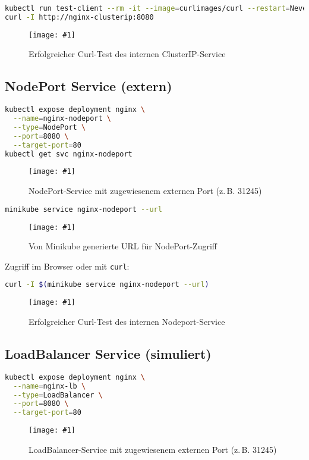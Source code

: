 \documentclass[BMR,Seminar,ngerman,IEEE]{twbook}
\newcommand{\screenshotH}[3]{%
  \begin{figure}[H]
    \centering
    \texttt{[image: \#1]}%
    \caption{#2}%
    \label{fig:#3}%
  \end{figure}%
}
\begin{document}
\begin{lstlisting}[language=bash,caption={Test im Cluster über temporären Curl-Pod}]
kubectl run test-client --rm -it --image=curlimages/curl --restart=Never -- sh
curl -I http://nginx-clusterip:8080
\end{lstlisting}
\screenshotH{minikube_test_reach_cluster.png}{Erfolgreicher Curl-Test des internen ClusterIP-Service}{clusterip-test}
\FloatBarrier

\subsection{NodePort Service (extern)}
\begin{lstlisting}[language=bash,caption={Erstellung eines NodePort-Service}]
kubectl expose deployment nginx \
  --name=nginx-nodeport \
  --type=NodePort \
  --port=8080 \
  --target-port=80
kubectl get svc nginx-nodeport
\end{lstlisting}
\screenshotH{minikube_expose_nodeport.png}{NodePort-Service mit zugewiesenem externen Port (z.\,B. 31245)}{nodeport-created}
\FloatBarrier

\begin{lstlisting}[language=bash,caption={Abrufen der externen URL über Minikube}]
minikube service nginx-nodeport --url
\end{lstlisting}
\screenshotH{minikube_service_nodeport_url.png}{Von Minikube generierte URL für NodePort-Zugriff}{minikube-url}
\FloatBarrier

Zugriff im Browser oder mit \texttt{curl}:
\begin{lstlisting}[language=bash]
curl -I $(minikube service nginx-nodeport --url)
\end{lstlisting}
\screenshotH{minikube_curl_nodeport_url.png}{Erfolgreicher Curl-Test des internen Nodeport-Service}{Nodeport-test}
\FloatBarrier

\subsection{LoadBalancer Service (simuliert)}
\begin{lstlisting}[language=bash,caption={Erstellung eines LoadBalancer-Service}]
kubectl expose deployment nginx \
  --name=nginx-lb \
  --type=LoadBalancer \
  --port=8080 \
  --target-port=80
\end{lstlisting}
\screenshotH{minikube_expose_loadbalancer.png}{LoadBalancer-Service mit zugewiesenem externen Port (z.\,B. 31245)}{loadbalancer-created}
\FloatBarrier
\end{document}
